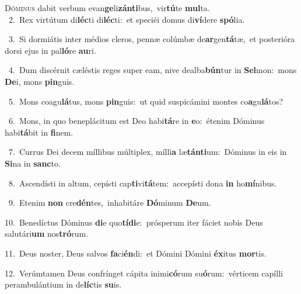 \lettrine{\initial\textcolor{\initialcolor}{D}}{óminus} dabit verbum evan\-\textbf{ge}\-li\-\textbf{zán}\-\textbf{ti}bus,~\star vir\-\textbf{tú}\-te \textbf{mul}\-ta.\\
{\numbfont\textcolor{\numbcolor}{~2.}}~Rex virtútum di\-\textbf{léc}\-ti di\-\textbf{léc}\-ti:~\star et speciéi domus di\-\textbf{ví}\-dere \textbf{spó}\-lia.\par
{\numbfont\textcolor{\numbcolor}{~3.}}~Si dormiátis inter médios cleros, pennæ colúmbæ de\-\textbf{ar}\-gen\-\textbf{tá}\-tæ,~\star et posterióra dorsi ejus in pal\-\textbf{ló}\-re \textbf{au}\-ri.\par
{\numbfont\textcolor{\numbcolor}{~4.}}~Dum discérnit cæléstis reges super eam, nive dealba\-\textbf{bún}\-tur in \textbf{Sel}\-mon:~\star mons \textbf{De}\-i, mons \textbf{pin}\-guis.\par
{\numbfont\textcolor{\numbcolor}{~5.}}~Mons coagu\-\textbf{lá}\-tus, mons \textbf{pin}\-guis:~\star ut quid suspicámini montes co\-\textbf{a}\-gu\-\textbf{lá}\-tos?\par
{\numbfont\textcolor{\numbcolor}{~6.}}~Mons, in quo beneplácitum est Deo habi\-\textbf{tá}\-re in \textbf{e}\-o:~\star étenim Dóminus habi\-\textbf{tá}\-bit in \textbf{fi}\-nem.\par
{\numbfont\textcolor{\numbcolor}{~7.}}~Currus Dei decem míllibus múltiplex, mílli\textbf{a} læ\-\textbf{tán}\-\textbf{ti}um:~\star Dóminus in eis in \textbf{Si}\-na in \textbf{sanc}\-to.\par
{\numbfont\textcolor{\numbcolor}{~8.}}~Ascendísti in altum, cepísti cap\-\textbf{ti}\-vi\-\textbf{tá}\-tem:~\star accepísti dona \textbf{in} ho\-\textbf{mí}\-nibus.\par
{\numbfont\textcolor{\numbcolor}{~9.}}~Etenim \textbf{non} cre\-\textbf{dén}\-tes,~\star inhabitáre \textbf{Dó}\-minum \textbf{De}\-um.\par
{\numbfont\textcolor{\numbcolor}{10.}}~Benedíctus Dóminus \textbf{di}\-e quo\-\textbf{tí}\-\textbf{di}e:~\star prósperum iter fáciet nobis Deus salutári\textbf{um} nos\-\textbf{tró}\-rum.\par
{\numbfont\textcolor{\numbcolor}{11.}}~Deus noster, Deus salvos \textbf{fa}\-ci\-\textbf{én}\-di:~\star et Dómini Dómini \textbf{éx}\-itus \textbf{mor}\-tis.\par
{\numbfont\textcolor{\numbcolor}{12.}}~Verúmtamen Deus confrínget cápita inimi\-\textbf{có}\-rum su\-\textbf{ó}\-rum:~\star vérticem capílli perambulántium in de\-\textbf{líc}\-tis \textbf{su}\-is.\par
